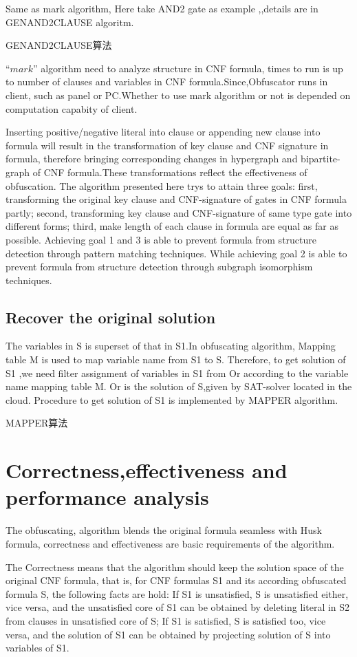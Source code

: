 \documentclass[runningheads,a4paper]{llncs}
\begin{document}
Same as mark algorithm, Here take AND2 gate as example ,,details are in GENAND2CLAUSE algoritm.

\noindent GENAND2CLAUSE算法

$“mark”$ algorithm need to analyze structure in CNF formula, times to run is up to number of clauses and variables in CNF formula.Since,Obfuscator runs in client, such as panel or PC.Whether to use mark algorithm or not is depended on computation capabity of client.

Inserting positive/negative literal into clause or appending new clause into formula will result in the transformation of key clause and CNF signature in formula, therefore bringing corresponding changes in hypergraph and bipartite-graph of CNF formula.These transformations reflect the effectiveness of obfuscation. The algorithm presented here trys to attain three goals: first, transforming the original key clause and CNF-signature of gates in CNF formula partly; second, transforming key clause and CNF-signature of same type gate into different forms; third, make length of each clause in formula are equal as far as possible. Achieving goal 1 and 3 is able to prevent formula from structure detection through pattern matching techniques. While achieving goal 2 is able to prevent formula from structure detection through subgraph isomorphism techniques. 
\subsection{Recover the original solution}

The variables in S is superset of that in S1.In obfuscating algorithm, Mapping table M is used to map variable name from S1 to S. Therefore, to get solution of S1 ,we need filter assignment of variables in S1 from Or according to the variable name mapping table M. Or is the solution of S,given by SAT-solver located in the cloud. Procedure to get solution of S1 is implemented by MAPPER algorithm.

\noindent MAPPER算法
\section{Correctness,effectiveness and performance analysis}

The obfuscating, algorithm blends the original formula seamless with Husk formula, correctness and effectiveness are basic requirements of the algorithm. 

The Correctness means that the algorithm should keep the solution space of the original CNF formula, that is, for CNF formulas S1 and its according obfuscated formula S, the following facts are hold: If S1 is unsatisfied, S is unsatisfied either, vice versa, and the unsatisfied core of S1 can be obtained by deleting literal in S2  from clauses in unsatisfied core of S; If S1 is satisfied, S is satisfied too, vice versa, and the solution of S1 can be obtained by projecting solution of S into variables of S1. 
\end{document}

